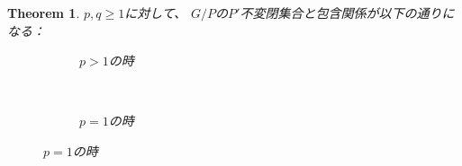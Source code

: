 \documentclass[12pt]{msjproc} %
\newtheorem{theorem}{Theorem}
\theoremstyle{definition}
\theoremstyle{exampstyle} \newtheorem{examp}[theorem]{Theorem}
\begin{document}
\begin{theorem}
$p, q \geqslant 1$に対して、
  $G/P$の$P'$不変閉集合と{包含関係}が以下の通りになる：\\
  \begin{figure}[H]
	  
    \centering
    \begin{subfigure}{0.3\textwidth}
	\caption{$p>1$の時}
    \end{subfigure}
    ~ %
    \begin{subfigure}{0.3\textwidth}
	\raisebox{40mm}
	{}
	\caption{$p=1$の時}
    \end{subfigure}
\end{figure}
\end{theorem}
\end{document}
